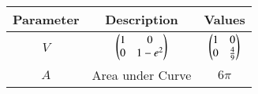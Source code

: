 \begin{tabular}[12pt]{|c|c|c|}
    \hline
    Parameter & Description & Values\\ 
    \hline
	$V$ & $\begin{pmatrix} 1 & 0 \\ 0 & 1-e^{2} \end{pmatrix}$ & $\begin{pmatrix}1 & 0 \\ 0 & \frac{4}{9} \end{pmatrix}$ \\
    \hline
    $A$ & Area under Curve & $6\pi$ \\ 
    \hline
    \end{tabular}
